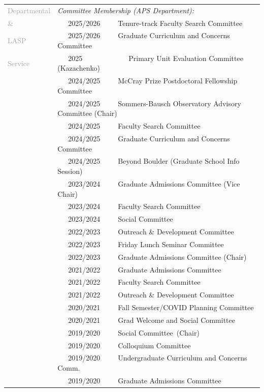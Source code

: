 \documentclass[letterpaper,10pt,twoside]{article}
\begin{document}
\noindent \begin{tabular}{@{} l l}
\large{\textcolor{darkgray}{Departmental}} & \textit{Committee Membership (APS Department):} \\
\large{\textcolor{darkgray}{\&}} & ~~~2025/2026~~~~~Tenure-track Faculty Search Committee\\
\large{\textcolor{darkgray}{LASP}}& ~~~2025/2026~~~~~Graduate Curriculum and Concerns Committee\\
\large{\textcolor{darkgray}{Service}}& ~~~2025~~~~~~~~~~~~~Primary Unit Evaluation Committee (Kazachenko) \\
 & ~~~2024/2025~~~~~McCray Prize Postdoctoral Fellowship Committee\\
 & ~~~2024/2025~~~~~Sommers-Bausch Observatory Advisory Committee (Chair) \\
 & ~~~2024/2025~~~~~Faculty Search Committee \\
 & ~~~2024/2025~~~~~Graduate Curriculum and Concerns Committee\\
 & ~~~2024/2025~~~~~Beyond Boulder (Graduate School Info Session)\\
 & ~~~2023/2024~~~~~Graduate Admissions Committee (Vice Chair)\\
 & ~~~2023/2024~~~~~Faculty Search Committee \\
 & ~~~2023/2024~~~~~Social Committee\\
 & ~~~2022/2023~~~~~Outreach \& Development Committee \\ 
 & ~~~2022/2023~~~~~Friday Lunch Seminar Committee\\
 & ~~~2022/2023~~~~~Graduate Admissions Committee (Chair) \\
 & ~~~2021/2022~~~~~Graduate Admissions Committee \\
 & ~~~2021/2022~~~~~Faculty Search Committee \\
 & ~~~2021/2022~~~~~Outreach \& Development Committee \\
 & ~~~2020/2021~~~~~Fall Semester/COVID Planning Committee \\
 & ~~~2020/2021~~~~~Grad Welcome and Social Committee \\
 & ~~~2019/2020~~~~~Social Committee~(Chair) \\
 & ~~~2019/2020~~~~~Colloquium Committee \\
 & ~~~2019/2020~~~~~Undergraduate Curriculum and Concerns Comm.\\
 & ~~~2019/2020~~~~~Graduate Admissions Committee \\

\end{tabular}
\end{document}
